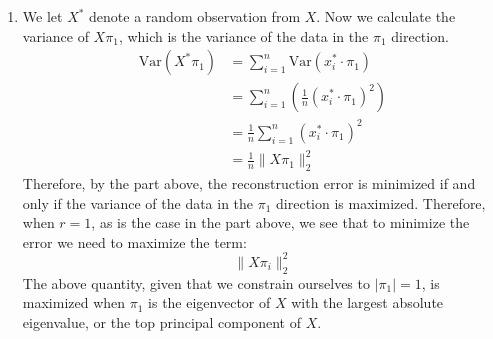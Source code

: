 \documentclass{harvardml}
\theoremstyle{plain}
\begin{document}
\begin{enumerate}[label=(\alph*)]
\item
We let $X^*$ denote a random observation from $X$. Now we calculate the variance of $X\pi_1$, which is the variance of the data in the $\pi_1$ direction.
\begin{align*}
\text{Var}(X^*\pi_1) &= \sum_{i=1}^n \text{Var}(x_i^* \cdot \pi_1) \tag{assuming $x_i$ are independent samples} \\
&= \sum_{i=1}^n \left(\frac{1}{n} (x_i^* \cdot \pi_1)^2\right) \tag{definition of sample variance, using fact that our data is centered with $\mu = 0$} \\
&= \frac{1}{n} \sum_{i=1}^n (x_i^* \cdot \pi_1)^2 \\
&= \frac{1}{n} \|X\pi_1 \|_2^2
\end{align*}
Therefore, by the part above, the reconstruction error is minimized if and only if the variance of the data in the $\pi_1$ direction is maximized. Therefore, when $r = 1$, as is the case in the part above, we see that to minimize the error we need to maximize the term:
$$
\|X\pi_i \|_2^2
$$
The above quantity, given that we constrain ourselves to $|\pi_1| = 1$, is maximized when $\pi_1$ is the eigenvector of $X$ with the largest absolute eigenvalue, or the top principal component of $X$.


\end{enumerate}
\end{document}
